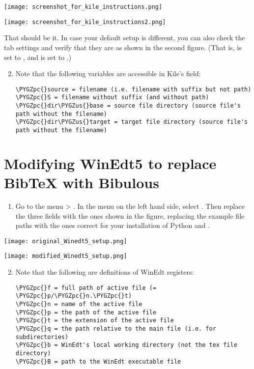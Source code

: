 \documentclass[letterpaper,10pt,english]{sphinxmanual}
\def\PYGZus{\char`\_}
\def\PYGZpc{\char`\%}
\begin{document}
\texttt{[image: screenshot\_for\_kile\_instructions.png]}

\texttt{[image: screenshot\_for\_kile\_instructions2.png]}

That should be it. In case your default setup is different, you can also check the  tab settings and verify that they are as shown in the second figure. (That is,  is set to , and  is set to .)
\begin{enumerate}
\setcounter{enumi}{1}
\item {} 
Note that the following variables are accessible in Kile's  field:

\begin{Verbatim}[commandchars=\\\{\}]
\PYGZpc{}source = filename (i.e. filename with suffix but not path)
\PYGZpc{}S = filename without suffix (and without path)
\PYGZpc{}dir\PYGZus{}base = source file directory (source file's path without the filename)
\PYGZpc{}dir\PYGZus{}target = target file directory (source file's path without the filename)
\end{Verbatim}

\end{enumerate}


\section{Modifying WinEdt5 to replace BibTeX with Bibulous}
\label{getting_started:modifying-winedt5-to-replace-bibtex-with-bibulous}\begin{enumerate}
\item {} 
Go to the menu  \textgreater{} . In the  menu on the left hand side, select . Then replace the three  fields with the ones shown in the figure, replacing the example file paths with the ones correct for your installation of Python and .

\end{enumerate}

\texttt{[image: original\_Winedt5\_setup.png]}

\texttt{[image: modified\_Winedt5\_setup.png]}
\begin{enumerate}
\setcounter{enumi}{1}
\item {} 
Note that the following are definitions of WinEdt registers:

\begin{Verbatim}[commandchars=\\\{\}]
\PYGZpc{}f = full path of active file (= \PYGZpc{}p/\PYGZpc{}n.\PYGZpc{}t)
\PYGZpc{}n = name of the active file
\PYGZpc{}p = the path of the active file
\PYGZpc{}t = the extension of the active file
\PYGZpc{}q = the path relative to the main file (i.e. for subdirectories)
\PYGZpc{}b = WinEdt's local working directory (not the tex file directory)
\PYGZpc{}B = path to the WinEdt executable file
\end{Verbatim}

\end{enumerate}
\end{document}
